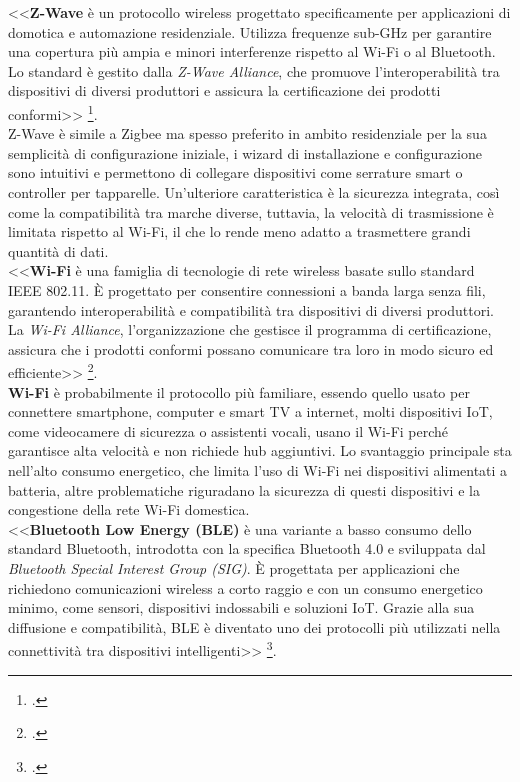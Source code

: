 <<\textbf{Z-Wave} è un protocollo wireless progettato specificamente per applicazioni di domotica e automazione residenziale. Utilizza frequenze sub-GHz per garantire una copertura più ampia e minori interferenze rispetto al Wi-Fi o al Bluetooth. Lo standard è gestito dalla \emph{Z-Wave Alliance}, che promuove l’interoperabilità tra dispositivi di diversi produttori e assicura la certificazione dei prodotti conformi>> \footcite{zwave_alliance}.\\
Z-Wave è simile a Zigbee ma spesso preferito in ambito residenziale per la sua semplicità di configurazione iniziale, i wizard di installazione e configurazione sono intuitivi e permettono di collegare dispositivi come serrature smart o controller per tapparelle. 
Un'ulteriore caratteristica è la sicurezza integrata, così come la compatibilità tra marche diverse, tuttavia, la velocità di trasmissione è limitata rispetto al Wi-Fi, il che lo rende meno adatto a trasmettere grandi quantità di dati.\\

<<\textbf{Wi-Fi} è una famiglia di tecnologie di rete wireless basate sullo standard IEEE 802.11. È progettato per consentire connessioni a banda larga senza fili, garantendo interoperabilità e compatibilità tra dispositivi di diversi produttori. La \emph{Wi-Fi Alliance}, l’organizzazione che gestisce il programma di certificazione, assicura che i prodotti conformi possano comunicare tra loro in modo sicuro ed efficiente>> \footcite{wifi_alliance}.\\

\textbf{Wi-Fi} è probabilmente il protocollo più familiare, essendo quello usato per connettere smartphone, computer e smart TV a internet, molti dispositivi IoT, come videocamere di sicurezza o assistenti vocali, usano il Wi-Fi perché garantisce alta velocità e non richiede hub aggiuntivi. 
Lo svantaggio principale sta nell’alto consumo energetico, che limita l’uso di Wi-Fi nei dispositivi alimentati a batteria, altre problematiche riguradano la sicurezza di questi dispositivi e la congestione della rete Wi-Fi domestica.\\

<<\textbf{Bluetooth Low Energy (BLE)} è una variante a basso consumo dello standard Bluetooth, introdotta con la specifica Bluetooth 4.0 e sviluppata dal \emph{Bluetooth Special Interest Group (SIG)}. È progettata per applicazioni che richiedono comunicazioni wireless a corto raggio e con un consumo energetico minimo, come sensori, dispositivi indossabili e soluzioni IoT. Grazie alla sua diffusione e compatibilità, BLE è diventato uno dei protocolli più utilizzati nella connettività tra dispositivi intelligenti>> \footcite{bluetooth_sig_ble}.\\


